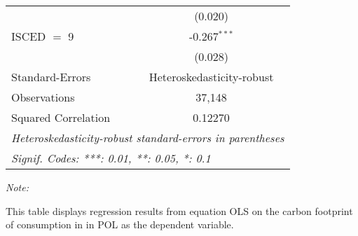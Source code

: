 \begin{table}[htbp!]
\begin{adjustbox}{width = 1\textwidth, max height = 0.95\textheight, center}
\begin{threeparttable}[b]
\begin{tabular}{lc}
                                & (0.020)\\   
            ISCED $=$ 9         & -0.267$^{***}$\\   
                                & (0.028)\\   
            \midrule 
            Standard-Errors     & Heteroskedasticity-robust \\   
            Observations        & 37,148\\  
            Squared Correlation & 0.12270\\  
            \midrule \midrule
            \multicolumn{2}{l}{\emph{Heteroskedasticity-robust standard-errors in parentheses}}\\
            \multicolumn{2}{l}{\emph{Signif. Codes: ***: 0.01, **: 0.05, *: 0.1}}\\
         \end{tabular}
         
         \begin{tablenotes}\item \medskip \textit{Note:}
            \item This table displays regression results from equation OLS on the carbon footprint of consumption in  in POL as the dependent variable.  
         \end{tablenotes}
      \end{threeparttable}
   \end{adjustbox}
\end{table}


